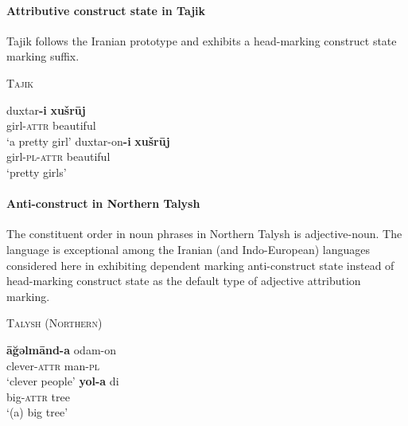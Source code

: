 \paragraph{Attributive construct state in Tajik}
Tajik follows the Iranian prototype and exhibits a head-marking construct state marking suffix.
\begin{exe}
\ex \textsc{Tajik} \citep{rastorgueva1963}
\begin{xlist}
\ex
\gll	duxtar\textbf{-i} \textbf{xušrūj}\\
	girl-\textsc{attr} beautiful\\
\glt	‘a pretty girl’
\ex
\gll	duxtar-on\textbf{-i} \textbf{xušrūj}\\
	girl-\textsc{pl}-\textsc{attr} beautiful\\
\glt	‘pretty girls’
\end{xlist}
\end{exe}

\paragraph{Anti-construct in Northern Talysh} \label{talysh synchr}
The constituent order in noun phrases in Northern Talysh is adjective-noun. The language is exceptional among the Iranian (and Indo-European) languages considered here in exhibiting dependent marking anti-construct state instead of head-marking construct state as the default type of adjective attribution marking.
\begin{exe}
\ex \textsc{Talysh (Northern)} \cite[27]{schulze2000}%
\begin{xlist}
\ex
\gll	\textbf{āğəlmānd-a} odam-on\\
	clever-\textsc{attr} man-\textsc{pl}\\
\glt	‘clever people’
\ex
\gll	\textbf{yol-a} di\\
	big-\textsc{attr} tree\\
\glt	‘(a) big tree’
\end{xlist}
\end{exe}

